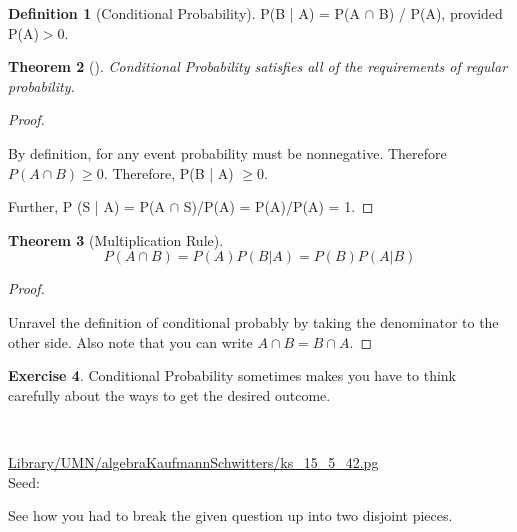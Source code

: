 \documentclass[10pt,]{book}
\theoremstyle{plain}
\newtheorem{theorem}{Theorem}[section]
\theoremstyle{definition}
\newtheorem{definition}[theorem]{Definition}
\theoremstyle{definition}
\theoremstyle{definition}
\newtheorem{exercise}[theorem]{Exercise}
\numberwithin{equation}{section}
\newcommand{\gt}{ > }
\begin{document}
\begin{definition}[{Conditional Probability}]\label{definition-19}
P(B | A) = P(A \(\cap\) B) / P(A), provided P(A)\(\gt 0\).\end{definition}
\begin{theorem}[{}]\label{theorem-17}
Conditional Probability satisfies all of the requirements of regular probability.\end{theorem}
\begin{proof}\hypertarget{proof-16}{}

		By definition, for any event probability must be nonnegative. Therefore
		\(P(A \cap B) \ge 0\).  Therefore, P(B | A) \(\ge 0\).
\par

		Further, P (S | A) = P(A \(\cap\) S)/P(A) = P(A)/P(A) = 1.
\end{proof}
\begin{theorem}[{Multiplication Rule}]\label{theorem-18}
\begin{equation*}P(A \cap B) = P(A) P(B | A) = P(B) P(A | B)\end{equation*}\end{theorem}
\begin{proof}\hypertarget{proof-17}{}

		Unravel the definition of conditional probably by taking the denominator to the other side. Also note that you can write \(A \cap B = B \cap A\).
\end{proof}
\begin{exercise}\label{exercise-8}
Conditional Probability sometimes makes you have to think carefully about the ways to get 
		the desired outcome.
\par\medskip
\mbox{}\\ %
\begin{mdframed}
{}\par\vspace*{2ex}%
{\tiny\ttfamily\noindent\url{Library/UMN/algebraKaufmannSchwitters/ks_15_5_42.pg}\\Seed: \hfill}\end{mdframed}
\medskip\noindent 
		See how you had to break the given question up into two disjoint pieces.
\par
\end{exercise}
\typeout{************************************************}
\typeout{************************************************}
\end{document}
